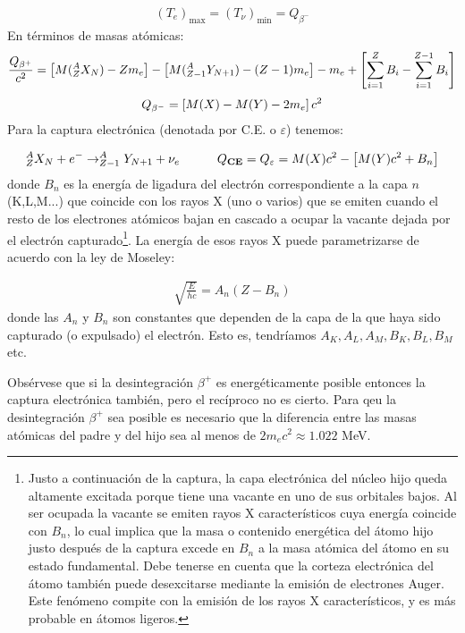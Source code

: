 \begin{eqnarray}
	(T_e)_{\max} = (T_\nu)_{\min} = Q_{\beta^-}
\end{eqnarray}
En términos de masas atómicas:
\begin{eqnarray}
	\frac{Q_{\beta^+}}{c^2} = \left[ M(^A_ZX_N) - Zm_e \right] - \left[ M(_{Z-1}^A Y_ {N+1})-(Z-1)m_e \right]  - m_e + \left[ \sum_{i=1}^{Z} B_i - \sum_{i=1}^{Z-1} B_i \right]
\end{eqnarray}
\begin{eqnarray}
	Q_ {\beta^-} = \left[ M(X)-M(Y)-2m_e \right] c^2 
\end{eqnarray}
Para la captura electrónica (denotada por C.E. o $\varepsilon$) tenemos:

\begin{equation}
	^A_ZX_N + e^- \rightarrow ^A_{Z-1} Y_{N+1} + \nu_e \quad \quad \quad Q_{\textbf{CE}} = Q_\varepsilon = M(X) c^2 - \left[ M(Y)c^2+ B_n \right]
\end{equation}
donde $B_n$ es la energía de ligadura del electrón correspondiente a la capa $n$ (K,L,M...) que coincide con los rayos X (uno o varios) que se emiten cuando el resto de los electrones atómicos bajan en cascado a ocupar la vacante dejada por el electrón capturado\footnote{Justo a continuación de la captura, la capa electrónica del núcleo hijo queda altamente excitada porque tiene una vacante en uno de sus orbitales bajos. Al ser ocupada la vacante se emiten rayos X característicos cuya energía coincide con $B_n$, lo cual implica que la masa o contenido energética del átomo hijo justo después de la captura excede en $B_n$ a la masa atómica del átomo en su estado fundamental. Debe tenerse en cuenta que la corteza electrónica del átomo también puede desexcitarse mediante la emisión de electrones Auger. Este fenómeno compite con la emisión de los rayos X característicos, y es más probable en átomos ligeros.}. La energía de esos rayos X puede parametrizarse de acuerdo con la ley de Moseley:

\begin{eqnarray}
	\sqrt{\frac{E}{hc}} = A_n (Z-B_n)
\end{eqnarray}	
donde las $A_n$ y $B_n$ son constantes que dependen de la capa de la que haya sido capturado (o expulsado) el electrón. Esto es, tendríamos $A_K,A_L,A_M,B_K,B_L,B_M$ etc.

Obsérvese que si la desintegración $\beta^+$ es energéticamente posible entonces la captura electrónica también, pero el recíproco no es cierto. Para qeu la desintegración $\beta^+$ sea posible es necesario que la diferencia entre las masas atómicas del padre y del hijo sea al menos de $2m_e c^2 \approx 1.022$ MeV.

